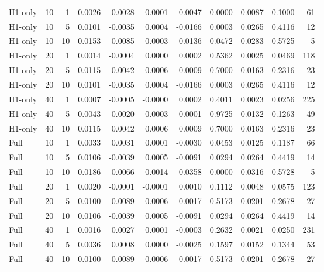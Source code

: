 \begin{tabular}{lrrrrrrrrrr}
H1-only & 10 & 1 & 0.0026 & -0.0028 & 0.0001 & -0.0047 & 0.0000 & 0.0087 & 0.1000 & 61 \\
H1-only & 10 & 5 & 0.0101 & -0.0035 & 0.0004 & -0.0166 & 0.0003 & 0.0265 & 0.4116 & 12 \\
H1-only & 10 & 10 & 0.0153 & -0.0085 & 0.0003 & -0.0136 & 0.0472 & 0.0283 & 0.5725 & 5 \\
H1-only & 20 & 1 & 0.0014 & -0.0004 & 0.0000 & 0.0002 & 0.5362 & 0.0025 & 0.0469 & 118 \\
H1-only & 20 & 5 & 0.0115 & 0.0042 & 0.0006 & 0.0009 & 0.7000 & 0.0163 & 0.2316 & 23 \\
H1-only & 20 & 10 & 0.0101 & -0.0035 & 0.0004 & -0.0166 & 0.0003 & 0.0265 & 0.4116 & 12 \\
H1-only & 40 & 1 & 0.0007 & -0.0005 & -0.0000 & 0.0002 & 0.4011 & 0.0023 & 0.0256 & 225 \\
H1-only & 40 & 5 & 0.0043 & 0.0020 & 0.0003 & 0.0001 & 0.9725 & 0.0132 & 0.1263 & 49 \\
H1-only & 40 & 10 & 0.0115 & 0.0042 & 0.0006 & 0.0009 & 0.7000 & 0.0163 & 0.2316 & 23 \\
Full & 10 & 1 & 0.0033 & 0.0031 & 0.0001 & -0.0030 & 0.0453 & 0.0125 & 0.1187 & 66 \\
Full & 10 & 5 & 0.0106 & -0.0039 & 0.0005 & -0.0091 & 0.0294 & 0.0264 & 0.4419 & 14 \\
Full & 10 & 10 & 0.0186 & -0.0066 & 0.0014 & -0.0358 & 0.0000 & 0.0316 & 0.5728 & 5 \\
Full & 20 & 1 & 0.0020 & -0.0001 & -0.0001 & 0.0010 & 0.1112 & 0.0048 & 0.0575 & 123 \\
Full & 20 & 5 & 0.0100 & 0.0089 & 0.0006 & 0.0017 & 0.5173 & 0.0201 & 0.2678 & 27 \\
Full & 20 & 10 & 0.0106 & -0.0039 & 0.0005 & -0.0091 & 0.0294 & 0.0264 & 0.4419 & 14 \\
Full & 40 & 1 & 0.0016 & 0.0027 & 0.0001 & -0.0003 & 0.2632 & 0.0021 & 0.0250 & 231 \\
Full & 40 & 5 & 0.0036 & 0.0008 & 0.0000 & -0.0025 & 0.1597 & 0.0152 & 0.1344 & 53 \\
Full & 40 & 10 & 0.0100 & 0.0089 & 0.0006 & 0.0017 & 0.5173 & 0.0201 & 0.2678 & 27 \\
\bottomrule
\end{tabular}
